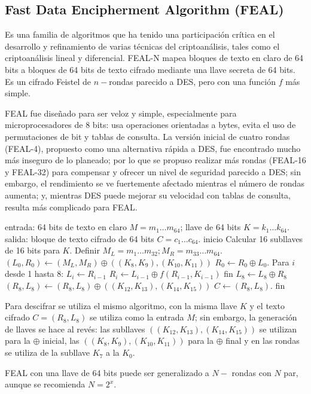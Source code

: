 \subsection{Fast Data Encipherment Algorithm (FEAL)}

Es una familia de algoritmos que ha tenido una participación crítica
en el desarrollo y refinamiento de varias técnicas del criptoanálisis,
tales como el criptoanálisis lineal y diferencial. FEAL-N mapea
bloques de texto en claro de 64 bits a bloques de 64 bits de texto
cifrado mediante una llave secreta de 64 bits. Es un cifrado Feistel de
$n-$rondas parecido a DES, pero con una función $f$ más simple.

FEAL fue diseñado para ser veloz y simple, especialmente para
microprocesadores de 8 bits: usa operaciones orientadas a bytes, evita
el uso de permutaciones de bit y tablas de consulta. La versión inicial
de cuatro rondas (FEAL-4), propuesto como una alternativa rápida a DES,
fue encontrado mucho más inseguro de lo planeado; por lo que se propuso
realizar más rondas (FEAL-16 y FEAL-32) para compensar y ofrecer un nivel
de seguridad parecido a DES; sin embargo, el rendimiento se ve fuertemente
afectado mientras el número de rondas aumenta; y, mientras DES puede
mejorar su velocidad con tablas de consulta, resulta más complicado
para FEAL.

\begin{pseudocodigo}[caption={FEAL-8, cifrado.}, label={feal8:1}]
  entrada:    64 bits de texto en claro $M = m_1 \dots m_64$;
              llave de 64 bits $K = k_1 \dots k_64$.
  salida:     bloque de texto cifrado de 64 bits $C = c_1 \dots c_64$.
  inicio
    Calcular 16 subllaves de 16 bits para $K$.
    Definir $M_L = m_1 \dots m_32; M_R = m_33 \dots m_64$.
    $(L_0, R_0) \leftarrow (M_L, M_R) \oplus ((K_8, K_9), (K_10, K_11))$
    $R_0 \leftarrow R_0 \oplus L_0$.
    Para $i$ desde 1 hasta 8:
      $L_i \leftarrow R_{i-1}$
      $R_i \leftarrow L_{i-1} \oplus f(R_{i-1}, K_{i-1})$
    fin
    $L_8 \leftarrow L_8 \oplus R_8$
    $(R_8, L_8) \leftarrow (R_8, L_8) \oplus ((K_12, K_13), (K_14, K_15))$
    $C \leftarrow (R_8, L_8)$.
  fin
\end{pseudocodigo}


Para descifrar se utiliza el mismo algoritmo, con la misma llave $K$ y el
texto cifrado $C = (R_8, L_8)$ se utiliza como la entrada $M$; sin
embargo, la generación de llaves se hace al revés: las subllaves
$((K_12, K_13), (K_14, K_15))$ se utilizan para la $\oplus$ inicial, las
$((K_8, K_9), (K_10, K_11))$ para la $\oplus$ final y en las rondas se
utiliza de la subllave $K_7$ a la $K_0$.

FEAL con una llave de 64 bits puede ser generalizado a $N-$ rondas con
$N$ par, aunque se recomienda $N = 2^x$.

